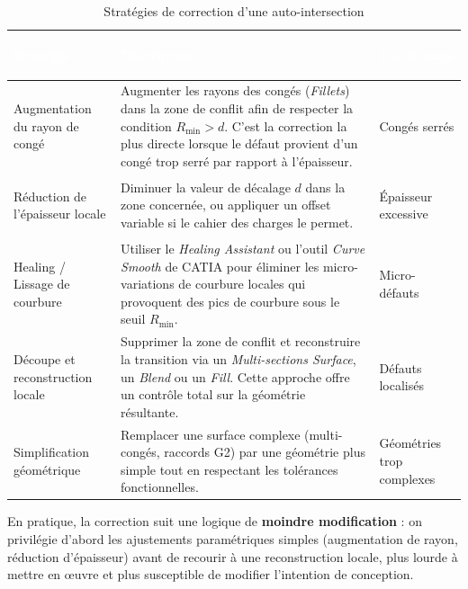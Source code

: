 \begin{table}[H]
    \centering
    \caption{Stratégies de correction d'une auto-intersection}
    \label{tab:strategies-correction}
    \begin{tabularx}{\textwidth}{|>{\bfseries\raggedright\arraybackslash}p{3.5cm}|X|>{\centering\arraybackslash}p{2.5cm}|}
        \hline
        \rowcolor{headerblue}
        \textcolor{white}{\textbf{Stratégie}} & \centering\textcolor{white}{\textbf{Description}} & \textcolor{white}{\textbf{Cas d'usage}} \tabularnewline
        \hline
        \rowcolor{rowlight}
        Augmentation du rayon de congé & Augmenter les rayons des congés (\textit{Fillets}) dans la zone de conflit afin de respecter la condition $R_{\min} > d$. C'est la correction la plus directe lorsque le défaut provient d'un congé trop serré par rapport à l'épaisseur. & Congés serrés \\
        \hline
        \rowcolor{rowwhite}
        Réduction de l'épaisseur locale & Diminuer la valeur de décalage $d$ dans la zone concernée, ou appliquer un offset variable si le cahier des charges le permet. & Épaisseur excessive \\
        \hline
        \rowcolor{rowlight}
        Healing / Lissage de courbure & Utiliser le \textit{Healing Assistant} ou l'outil \textit{Curve Smooth} de CATIA pour éliminer les micro-variations de courbure locales qui provoquent des pics de courbure sous le seuil $R_{\min}$. & Micro-défauts \\
        \hline
        \rowcolor{rowwhite}
        Découpe et reconstruction locale & Supprimer la zone de conflit et reconstruire la transition via un \textit{Multi-sections Surface}, un \textit{Blend} ou un \textit{Fill}. Cette approche offre un contrôle total sur la géométrie résultante. & Défauts localisés \\
        \hline
        \rowcolor{rowlight}
        Simplification géométrique & Remplacer une surface complexe (multi-congés, raccords G2) par une géométrie plus simple tout en respectant les tolérances fonctionnelles. & Géométries trop complexes \\
        \hline
    \end{tabularx}
\end{table}

En pratique, la correction suit une logique de \textbf{moindre modification} : on privilégie d'abord les ajustements paramétriques simples (augmentation de rayon, réduction d'épaisseur) avant de recourir à une reconstruction locale, plus lourde à mettre en œuvre et plus susceptible de modifier l'intention de conception.

